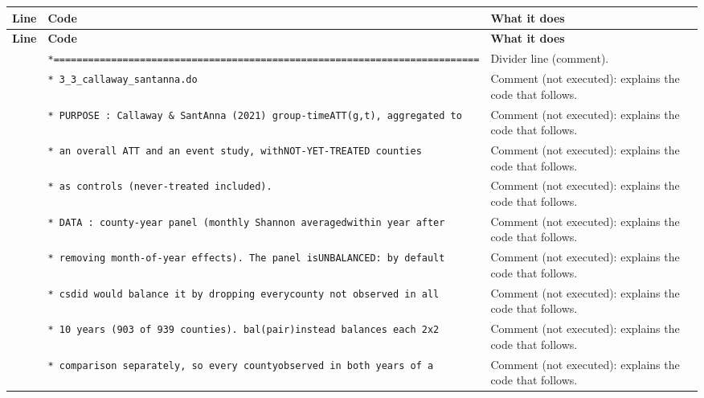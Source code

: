 \documentclass[10pt]{article}
\newcommand{\codetable}[1]{%
{\footnotesize
\begin{longtable}{>{\raggedleft\arraybackslash}p{0.55cm}>{\raggedright\arraybackslash}p{8.3cm}>{\raggedright\arraybackslash}p{8.0cm}}
\toprule \textbf{Line} & \textbf{Code} & \textbf{What it does}\\ \midrule \endfirsthead
\toprule \textbf{Line} & \textbf{Code} & \textbf{What it does}\\ \midrule \endhead
\bottomrule \endfoot
#1
\end{longtable}}}
\begin{document}
\codetable{1 & \texttt{*=========================================================\newline \hspace*{1em}=================} & Divider line (comment).\\
2 & \texttt{* 3\_3\_callaway\_santanna.do} & Comment (not executed): explains the code that follows.\\
3 & \texttt{* PURPOSE : Callaway \& Sant\textquotesingle{}Anna (2021) group-{}time\newline \hspace*{1em}ATT(g,t), aggregated to} & Comment (not executed): explains the code that follows.\\
4 & \texttt{*           an overall ATT and an event study, with\newline \hspace*{1em}NOT-{}YET-{}TREATED counties} & Comment (not executed): explains the code that follows.\\
5 & \texttt{*           as controls (never-{}treated included).} & Comment (not executed): explains the code that follows.\\
6 & \texttt{* DATA    : county-{}year panel (monthly Shannon averaged\newline \hspace*{1em}within year after} & Comment (not executed): explains the code that follows.\\
7 & \texttt{*           removing month-{}of-{}year effects). The panel is\newline \hspace*{1em}UNBALANCED: by default} & Comment (not executed): explains the code that follows.\\
8 & \texttt{*           csdid would balance it by dropping every\newline \hspace*{1em}county not observed in all} & Comment (not executed): explains the code that follows.\\
9 & \texttt{*           10 years (903 of 939 counties). bal(pair)\newline \hspace*{1em}instead balances each 2x2} & Comment (not executed): explains the code that follows.\\
10 & \texttt{*           comparison separately, so every county\newline \hspace*{1em}observed in both years of a} & Comment (not executed): explains the code that follows.\\
}
\end{document}
